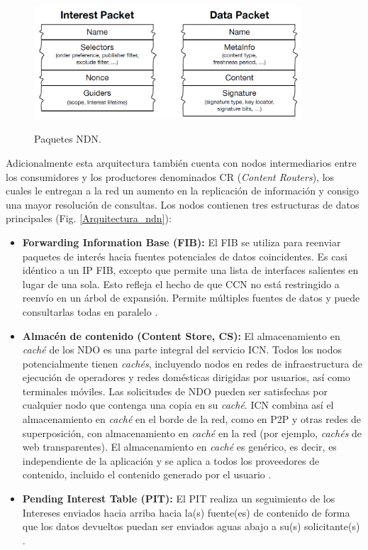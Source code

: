 \documentclass[12pt]{ociamthesis}  %
\begin{document}
\begin{figure}[!htb]
		\centering
		\includegraphics[width=10cm]{Paquetes_NDN.png}\\
		\caption{Paquetes NDN.}
		\label{Paquetes_NDN}
\end{figure}
 
Adicionalmente esta arquitectura también cuenta con nodos intermediarios entre los consumidores y los productores denominados CR (\textit{Content Routers}), los cuales le entregan a la red un aumento en la replicación de información y consigo una mayor resolución de consultas. Los nodos contienen tres estructuras de datos principales (Fig. \ref{Arquitectura_ndn}):

\begin{itemize}
	\item\textbf{Forwarding Information Base (FIB):} El FIB se utiliza para reenviar paquetes de interés hacia fuentes potenciales de datos coincidentes. Es casi idéntico a un IP FIB, excepto que permite una lista de interfaces salientes en lugar de una sola. Esto refleja el hecho de que CCN no está restringido a reenvío en un árbol de expansión. Permite múltiples fuentes de datos y puede consultarlas todas en paralelo \cite{jacobson2009networking}.\\
	\item \textbf{Almacén de contenido (Content Store, CS):} El almacenamiento en \textit{caché} de los NDO es una parte integral del servicio ICN. Todos los nodos potencialmente tienen \textit{cachés}, incluyendo nodos en redes de infraestructura de ejecución de operadores y redes domésticas dirigidas por usuarios, así como terminales móviles. Las solicitudes de NDO pueden ser satisfechas por cualquier nodo que contenga una copia en su \textit{caché}. ICN combina así el almacenamiento en \textit{caché} en el borde de la red, como en P2P y otras redes de superposición, con almacenamiento en \textit{caché} en la red (por ejemplo, \textit{cachés} de web transparentes). El almacenamiento en \textit{caché} es genérico, es decir, es independiente de la aplicación y se aplica a todos los proveedores de contenido, incluido el contenido generado por el usuario \cite{jacobson2009networking}.\\
	\item \textbf{Pending Interest Table (PIT):} El PIT realiza un seguimiento de los Intereses enviados hacia arriba hacia la(s) fuente(es) de contenido de forma que los datos devueltos puedan ser enviados aguas abajo a su(s) solicitante(s) \cite{jacobson2009networking}.\\
\end{itemize}
\end{document}
